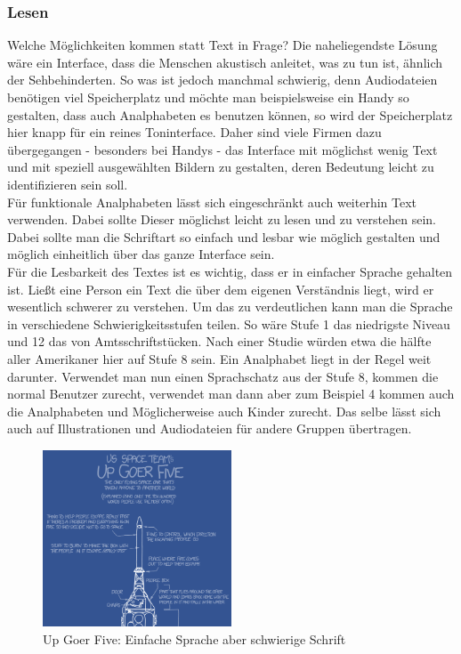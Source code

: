 \subsubsection{Lesen}
Welche Möglichkeiten kommen statt Text in Frage? Die naheliegendste Lösung wäre ein Interface, dass die Menschen akustisch anleitet, was zu tun ist, ähnlich der Sehbehinderten. So was ist jedoch manchmal schwierig, denn Audiodateien benötigen viel Speicherplatz und möchte man beispielsweise ein Handy so gestalten, dass auch Analphabeten es benutzen können, so wird der Speicherplatz hier knapp für ein reines Toninterface. Daher sind viele Firmen dazu übergegangen - besonders bei Handys - das Interface mit möglichst wenig Text und mit speziell ausgewählten Bildern zu gestalten, deren Bedeutung leicht zu identifizieren sein soll.\\
Für funktionale Analphabeten lässt sich eingeschränkt auch weiterhin Text verwenden. Dabei sollte Dieser möglichst leicht zu lesen und zu verstehen sein. Dabei sollte man die Schriftart so einfach und lesbar wie möglich gestalten und möglich einheitlich über das ganze Interface sein.\\
Für die Lesbarkeit des Textes ist es wichtig, dass er in einfacher Sprache gehalten ist. Ließt eine Person ein Text die über dem eigenen Verständnis liegt, wird er wesentlich schwerer zu verstehen. Um das zu verdeutlichen kann man die Sprache in verschiedene Schwierigkeitsstufen teilen.
So wäre Stufe 1 das niedrigste Niveau und  12 das von Amtsschriftstücken. Nach einer Studie würden etwa die hälfte aller Amerikaner hier auf Stufe 8 sein. Ein Analphabet liegt in der Regel weit darunter. Verwendet man nun einen Sprachschatz aus der Stufe 8, kommen die normal Benutzer zurecht, verwendet man dann aber zum Beispiel 4 kommen auch die Analphabeten und Möglicherweise auch Kinder zurecht. Das selbe lässt sich auch auf Illustrationen und Audiodateien für andere Gruppen übertragen.

\begin{figure}[h]
	\centering
		\includegraphics[width=0.50\textwidth]{Daten/up_goer_five_part.png}
	\caption{Up Goer Five: Einfache Sprache aber schwierige Schrift}
	\label{fig:GiveFive}
\end{figure}

